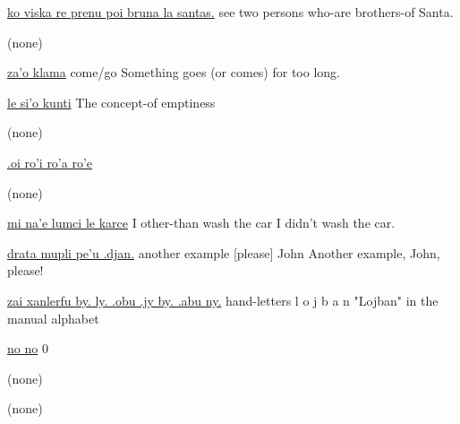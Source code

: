 \begin{example}
\hyperref[img:8]{ko viska re prenu poi bruna la santas.} \n
[You!] see two persons who-are brothers-of Santa.
\end{example}

\begin{example}
(none)
\end{example}

\begin{example}
\hyperref[img:10]{za'o klama} \n
[superfective] come/go \n
Something goes (or comes) for too long.
\end{example}

\begin{example}
\hyperref[img:11]{le si'o kunti} \n
The concept-of emptiness
\end{example}

\begin{example}
(none)
\end{example}

\begin{example}
\hyperref[img:13]{.oi ro'i ro'a ro'e} \n
[Pain!] [emotional] [social] [mental]
\end{example}

\begin{example}
(none)
\end{example}

\begin{example}
\hyperref[img:15]{mi na'e lumci le karce} \n
I other-than wash the car \n
I didn't wash the car.
\end{example}

\begin{example}
\hyperref[img:16]{drata mupli pe'u .djan.} \n
another example [please] John \n
Another example, John, please!
\end{example}

\begin{example}
\hyperref[img:17]{zai xanlerfu by. ly. .obu .jy by. .abu ny.} \n
[Shift] hand-letters l o j b a n \n
"Lojban" in the manual alphabet
\end{example}

\begin{example}
\hyperref[img:18]{no no}  0
\end{example}

\begin{example}
(none)
\end{example}

\begin{example}
(none)
\end{example}

